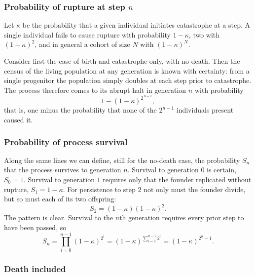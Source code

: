 \subsubsection*{Probability of rupture at step \texorpdfstring{$n$}{n}}

Let $\kappa$ be the probability that a given individual initiates catastrophe at a
step. A single individual fails to cause rupture with probability $1-\kappa$, two
with $(1-\kappa)^2$, and in general a cohort of size $N$ with $(1-\kappa)^N$.

Consider first the case of birth and catastrophe only, with no death. Then the
census of the living population at any generation is known with certainty: from a
single progenitor the population simply doubles at each step prior to catastrophe.
The process therefore comes to its abrupt halt in generation $n$ with probability
\begin{equation*}
1-(1-\kappa)^{2^{\,n-1}},
\end{equation*}
that is, one minus the probability that none of the $2^{n-1}$ individuals present
caused it.

\subsubsection*{Probability of process survival}

Along the same lines we can define, still for the no-death case, the probability
$S_n$ that the process survives to generation $n$. Survival to generation $0$ is
certain, $S_0=1$. Survival to generation $1$ requires only that the founder
replicated without rupture, $S_1 = 1-\kappa$. For persistence to step $2$ not only
must the founder divide, but so must each of its two offspring:
\begin{equation*}
S_2 = (1-\kappa)(1-\kappa)^2 .
\end{equation*}
The pattern is clear. Survival to the $n$th generation requires every prior step to
have been passed, so
\begin{equation}
\label{eq:bdcS}
S_n = \prod_{i=0}^{n-1}(1-\kappa)^{2^i} = (1-\kappa)^{\sum_{i=0}^{n-1}2^i} = (1-\kappa)^{2^n-1}.
\end{equation}

\subsubsection*{Death included}

